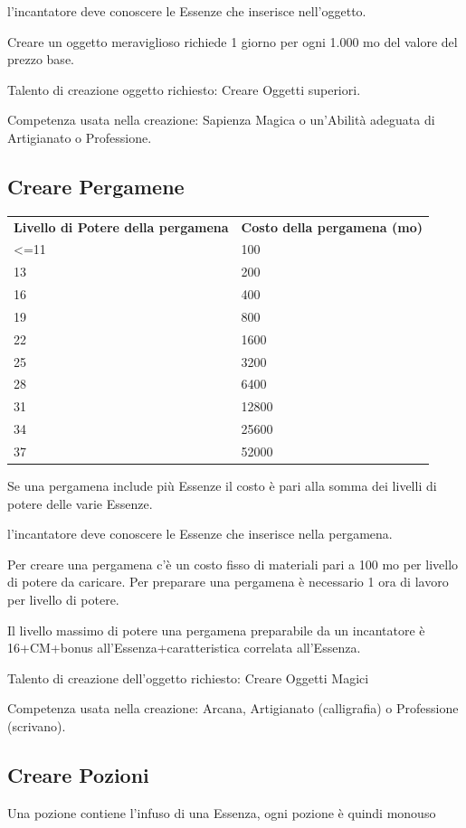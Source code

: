 \documentclass[a4paper,11pt,twoside,openany]{book}
\begin{document}
{l'incantatore deve conoscere le Essenze che inserisce nell'oggetto.

Creare un oggetto meraviglioso richiede 1 giorno per ogni 1.000 mo del valore del prezzo base.

Talento di creazione oggetto richiesto: Creare Oggetti superiori.

Competenza usata nella creazione: Sapienza Magica o un'Abilità adeguata
di Artigianato o Professione.

\subsection{Creare Pergamene}

\begin{tabular}{ll}
\toprule
\textbf{Livello di Potere della pergamena} & \textbf{Costo della pergamena (mo)}\tabularnewline
\textless=11 & 100\tabularnewline
13 & 200\tabularnewline
16 & 400\tabularnewline
19 & 800\tabularnewline
22 & 1600\tabularnewline
25 & 3200\tabularnewline
28 & 6400\tabularnewline
31 & 12800\tabularnewline
34 & 25600\tabularnewline
37 & 52000\tabularnewline
\end{tabular}

\bigskip

Se una pergamena include più Essenze il costo è pari alla somma dei livelli di potere delle varie Essenze.

l'incantatore deve conoscere le Essenze che inserisce nella pergamena.

Per creare una pergamena c'è un costo fisso di materiali pari a 100 mo per livello di potere da caricare. Per preparare una pergamena è necessario 1 ora di lavoro per livello di potere.

Il livello massimo di potere una pergamena preparabile da un incantatore è 16+CM+bonus all'Essenza+caratteristica correlata all'Essenza.

Talento di creazione dell'oggetto richiesto: Creare Oggetti Magici

Competenza usata nella creazione: Arcana, Artigianato (calligrafia) o Professione (scrivano).

\subsection{Creare Pozioni}

Una pozione contiene l'infuso di una Essenza, ogni pozione è quindi monouso

}
\end{document}
